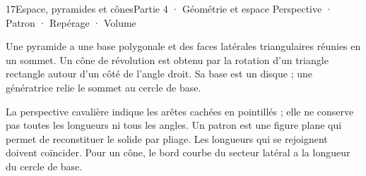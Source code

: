 \begin{ouverture}[espace]{17}{Espace, pyramides et cônes}{Partie 4 · Géométrie et espace}
{Perspective · Patron · Repérage · Volume}
\end{ouverture}
\pagestyle{otMain}\essentiel\fontsize{11}{15}\selectfont
{}\label{cours-17-1}
\begin{definition}Une pyramide a une base polygonale et des faces latérales triangulaires réunies en un sommet. Un cône de révolution est obtenu par la rotation d’un triangle rectangle autour d’un côté de l’angle droit. Sa base est un disque ; une génératrice relie le sommet au cercle de base.\end{definition}
\begin{savoirfaire}La perspective cavalière indique les arêtes cachées en pointillés ; elle ne conserve pas toutes les longueurs ni tous les angles. Un patron est une figure plane qui permet de reconstituer le solide par pliage. Les longueurs qui se rejoignent doivent coïncider. Pour un cône, le bord courbe du secteur latéral a la longueur du cercle de base.\end{savoirfaire}
\label{fig-cours-17-1-cours-solides}

